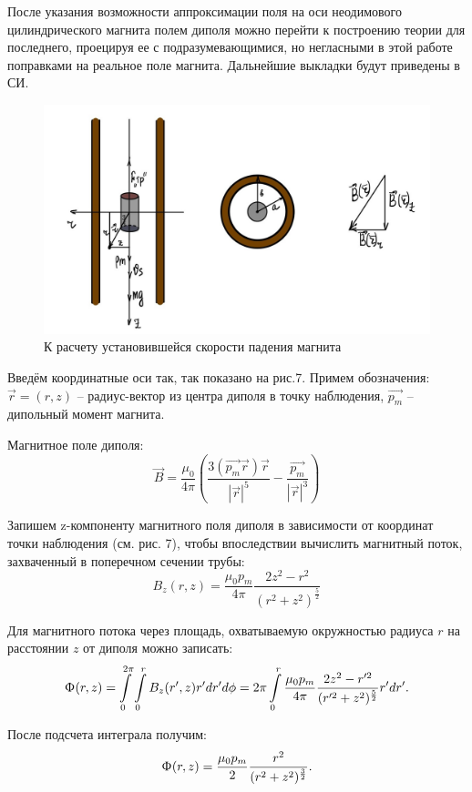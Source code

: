 \documentclass[a4paper,12pt]{article} %
\begin{document}
После указания возможности аппроксимации поля на оси неодимового цилиндрического магнита полем диполя можно перейти к построению теории для последнего, проецируя ее с подразумевающимися, но негласными в этой работе поправками на реальное поле магнита. Дальнейшие выкладки будут приведены в СИ.

\begin{figure}[h!]
	\centering
	\includegraphics[scale=0.4]{3.JPG}
	\caption{К расчету установившейся скорости падения магнита}
\end{figure}

Введём координатные оси так, так показано на рис.7.
Примем обозначения: $\overrightarrow{r} = (r,z)$ -- радиус-вектор из центра диполя в точку наблюдения,\: $\overrightarrow{p_m}$ -- дипольный момент магнита.

Магнитное поле диполя: $$\overrightarrow{B} = \dfrac{\mu_0}{4\pi}\left(\dfrac{3(\overrightarrow{p_m} \overrightarrow{r})\overrightarrow{r}}{|\overrightarrow{r}|^5} - \dfrac{\overrightarrow{p_m}}{|\overrightarrow{r}|^3}\right)$$

Запишем z-компоненту магнитного поля диполя в зависимости от координат точки наблюдения (см. рис. 7), чтобы впоследствии вычислить магнитный поток, захваченный в поперечном сечении трубы: $$B_z(r,z) = \dfrac{\mu_0 p_m}{4\pi} \dfrac{2z^2 - r^2}{(r^2 + z^2)^\frac{5}{2}}$$

Для магнитного потока через площадь, охватываемую окружностью радиуса $r$ на расстоянии $z$ от диполя можно записать:
$$\Upphi(r,z) = \int\limits_{0}^{2\pi}\int\limits_{0}^{r}B_z(r^\prime,z) r^\prime d r^\prime d \phi = 2\pi \int\limits_{0}^{r}\dfrac{\mu_0 p_m}{4\pi}\dfrac{2z^2 - r^{\prime2}}{(r^{\prime 2} + z^2)^\frac{5}{2}} r^\prime dr^\prime.$$

После подсчета интеграла получим:
$$\Upphi(r,z) = \dfrac{\mu_0 p_m}{2}\dfrac{r^2}{(r^2 + z^2)^\frac{3}{2}}.$$
\end{document}
